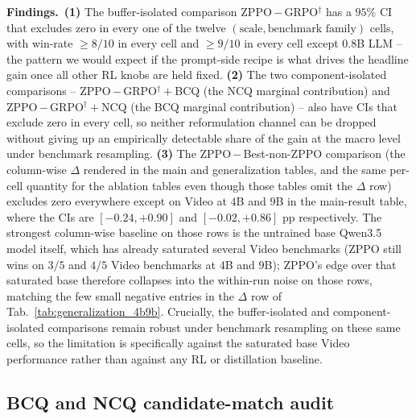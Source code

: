 \textbf{Findings.}~\textbf{(1)} The buffer-isolated comparison ZPPO\,$-$\,GRPO$^{\dagger}$ has a $95$\% CI that excludes zero in every one of the twelve $(\text{scale}, \text{benchmark family})$ cells, with win-rate $\geq\!8/10$ in every cell and $\geq\!9/10$ in every cell except $0.8$B LLM -- the pattern we would expect if the prompt-side recipe is what drives the headline gain once all other RL knobs are held fixed. \textbf{(2)} The two component-isolated comparisons -- ZPPO\,$-$\,GRPO$^{\dagger}\!+\!$BCQ (the NCQ marginal contribution) and ZPPO\,$-$\,GRPO$^{\dagger}\!+\!$NCQ (the BCQ marginal contribution) -- also have CIs that exclude zero in every cell, so neither reformulation channel can be dropped without giving up an empirically detectable share of the gain at the macro level under benchmark resampling. \textbf{(3)} The ZPPO\,$-$\,Best-non-ZPPO comparison (the column-wise $\Delta$ rendered in the main and generalization tables, and the same per-cell quantity for the ablation tables even though those tables omit the $\Delta$ row) excludes zero everywhere except on Video at $4$B and $9$B in the main-result table, where the CIs are $[-0.24, +0.90]$ and $[-0.02, +0.86]$ pp respectively. The strongest column-wise baseline on those rows is the untrained base Qwen3.5 model itself, which has already saturated several Video benchmarks (ZPPO still wins on $3/5$ and $4/5$ Video benchmarks at $4$B and $9$B); ZPPO's edge over that saturated base therefore collapses into the within-run noise on those rows, matching the few small negative entries in the $\Delta$ row of Tab.~\ref{tab:generalization_4b9b}. Crucially, the buffer-isolated and component-isolated comparisons remain robust under benchmark resampling on these same cells, so the limitation is specifically against the saturated base Video performance rather than against any RL or distillation baseline.





\subsection{BCQ and NCQ candidate-match audit}
\label{sec:appendix:bcq_audit}

